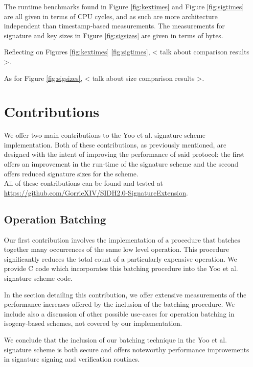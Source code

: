 The runtime benchmarks found in Figure \ref{fig:kextimes} and Figure \ref{fig:sigtimes} are all given in terms of CPU cycles, and as such are more architecture independent than timestamp-based measurements. The measurements for signature and key sizes in Figure \ref{fig:sigsizes} are given in terms of bytes. 

Reflecting on Figures \ref{fig:kextimes} \ref{fig:sigtimes}, < talk about comparison results >.

As for Figure \ref{fig:sigsizes}, < talk about size comparison results >.

\section{Contributions}

We offer two main contributions to the Yoo et al. signature scheme implementation. Both of these contributions, as previously mentioned, are designed with the intent of improving the performance of said protocol: the first offers an improvement in the run-time of the signature scheme and the second offers reduced signature sizes for the scheme.\\

\noindent
All of these contributions can be found and tested at \url{https://github.com/GorrieXIV/SIDH2.0-SignatureExtension}.

\subsection{Operation Batching}

Our first contribution involves the implementation of a procedure that batches together many occurrences of the same low level operation. This procedure significantly reduces the total count of a particularly expensive operation. We provide C code which incorporates this batching procedure into the Yoo et al. signature scheme code.

In the section detailing this contribution, we offer extensive measurements of the performance increases offered by the inclusion of the batching procedure. We include also a discussion of other possible use-cases for operation batching in isogeny-based schemes, not covered by our implementation.

We conclude that the inclusion of our batching technique in the Yoo et al. signature scheme is both secure and offers noteworthy performance improvements in signature signing and verification routines.

